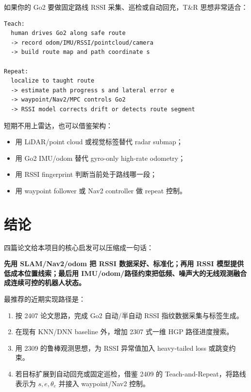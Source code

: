 \documentclass[UTF8,a4paper,12pt]{ctexrep}
\begin{document}
如果你的 Go2 要做固定路线 RSSI 采集、巡检或自动回充，T\&R 思想非常适合：

\begin{lstlisting}
Teach:
  human drives Go2 along safe route
  -> record odom/IMU/RSSI/pointcloud/camera
  -> build route map and path coordinate s

Repeat:
  localize to taught route
  -> estimate path progress s and lateral error e
  -> waypoint/Nav2/MPC controls Go2
  -> RSSI model corrects drift or detects route segment
\end{lstlisting}

短期不用上雷达，也可以借鉴架构：

\begin{itemize}
  \item 用 LiDAR/point cloud 或视觉标签替代 radar submap；
  \item 用 Go2 IMU/odom 替代 gyro-only high-rate odometry；
  \item 用 RSSI fingerprint 判断当前处于路线哪一段；
  \item 用 waypoint follower 或 Nav2 controller 做 repeat 控制。
\end{itemize}

\chapter{结论}

四篇论文给本项目的核心启发可以压缩成一句话：

\begin{center}
\textbf{先用 SLAM/Nav2/odom 把 RSSI 数据采好、标准化；再用 RSSI 模型提供低成本位置线索；最后用 IMU/odom/路径约束把低频、噪声大的无线观测融合成连续可控的机器人状态。}
\end{center}

最推荐的近期实现路径是：

\begin{enumerate}
  \item 按 2407 论文思路，完成 Go2 自动/半自动 RSSI 指纹数据采集与标签生成。
  \item 在现有 KNN/DNN baseline 外，增加 2307 式一维 HGP 路径进度搜索。
  \item 用 2309 的鲁棒观测思想，为 RSSI 异常值加入 heavy-tailed loss 或跳变约束。
  \item 若目标扩展到自动回充或固定巡检，借鉴 2409 的 Teach-and-Repeat，将路线表示为 \(s,e,\theta_e\) 并接入 waypoint/Nav2 控制。
\end{enumerate}
\end{document}
